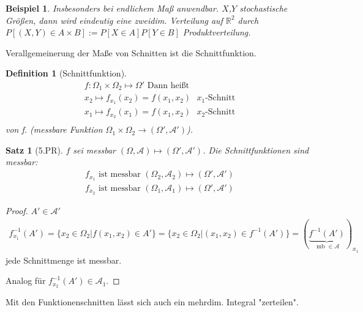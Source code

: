 \documentclass[]{article}
\newtheorem{theorem}{Satz}
\newtheorem{definition}{Definition}
\newtheorem*{example}{Beispiel}
\begin{document}
\begin{example}
	Insbesonders bei endlichem Maß anwendbar. $X$,$Y$ stochastische Größen, dann wird eindeutig eine zweidim. Verteilung auf $\mathbb{R}^2$ durch $P[(X,Y)\in A\times B] := P[X\in A] P[Y \in B]$ Produktverteilung.
\end{example}

Verallgemeinerung der Maße von Schnitten ist die Schnittfunktion.
\begin{definition}[Schnittfunktion]
	\begin{align*}
		f:\Omega_1\times\Omega_2 \mapsto\Omega' \text{ Dann heißt }\\
		x_2 \mapsto f_{x_1}(x_2) = f(x_1,x_2) \text{ $x_1$-Schnitt}\\
		x_1 \mapsto f_{x_2}(x_1) = f(x_1,x_2) \text{ $x_2$-Schnitt}\\
	\end{align*}
	von f. (messbare Funktion $\Omega_1\times\Omega_2 \to (\Omega', \mathcal{A}')$).
\end{definition}

\begin{theorem}[5.PR]
	$f$ sei messbar $(\Omega, \mathcal{A}) \mapsto (\Omega', \mathcal{A}')$.
	Die Schnittfunktionen sind messbar:
	\begin{align*}
		f_{x_1} \text{ ist messbar } (\Omega_2,\mathcal{A}_2) \mapsto (\Omega', \mathcal{A}')\\
		f_{x_2} \text{ ist messbar } (\Omega_1,\mathcal{A}_1) \mapsto (\Omega', \mathcal{A}')
	\end{align*}
\end{theorem}
\begin{proof}
	$A'\in\mathcal{A}'$
	\begin{align*}
		f_{x_1}^{-1}(A') = \{x_2\in\Omega_2 | f(x_1,x_2) \in A'\} = \{x_2\in \Omega_2 | (x_1,x_2) \in f^{-1}(A')\} = (\underbrace{f^{-1}(A')}_{\text{ mb } \in \mathcal{A}})_{x_1}
	\end{align*}
	jede Schnittmenge ist messbar.
	
	Analog für $f_{x_2}^{-1}(A') \in \mathcal{A}_1$.
\end{proof}

Mit den Funktionenschnitten lässt sich auch ein mehrdim. Integral "zerteilen".
\end{document}
